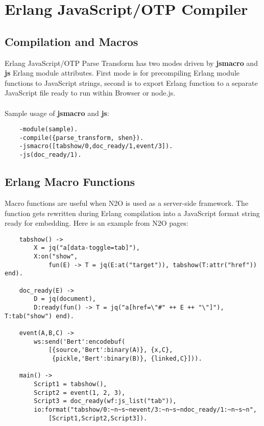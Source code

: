 \section{Erlang JavaScript/OTP Compiler}

\subsection{Compilation and Macros}
Erlang JavaScript/OTP Parse Transform has two modes driven
by {\bf \-jsmacro} and {\bf \-js} Erlang module attributes.
First mode is for precompiling Erlang module functions
to JavaScript strings, second is to export Erlang function
to a separate JavaScript file ready to run within Browser or node.js.

\paragraph{}
Sample usage of {\bf \-jsmacro} and {\bf \-js}:

\vspace{1\baselineskip}
\begin{lstlisting}
    -module(sample).
    -compile({parse_transform, shen}).
    -jsmacro([tabshow/0,doc_ready/1,event/3]).
    -js(doc_ready/1).
\end{lstlisting}

\subsection{Erlang Macro Functions}
Macro functions are useful when N2O is used as a server-side framework.
The function gets rewritten during Erlang compilation into a JavaScript format
string ready for embedding. Here is an example from N2O pages:

\begin{lstlisting}
    tabshow() ->
        X = jq("a[data-toggle=tab]"),
        X:on("show", 
            fun(E) -> T = jq(E:at("target")), tabshow(T:attr("href")) end).

    doc_ready(E) ->
        D = jq(document),
        D:ready(fun() -> T = jq("a[href=\"#" ++ E ++ "\"]"), T:tab("show") end).

    event(A,B,C) ->
        ws:send('Bert':encodebuf(
            [{source,'Bert':binary(A)}, {x,C},
             {pickle,'Bert':binary(B)}, {linked,C}])).

    main() ->
        Script1 = tabshow(),
        Script2 = event(1, 2, 3),
        Script3 = doc_ready(wf:js_list("tab")),
        io:format("tabshow/0:~n~s~nevent/3:~n~s~ndoc_ready/1:~n~s~n",
            [Script1,Script2,Script3]).
\end{lstlisting}
\vspace{1\baselineskip}

